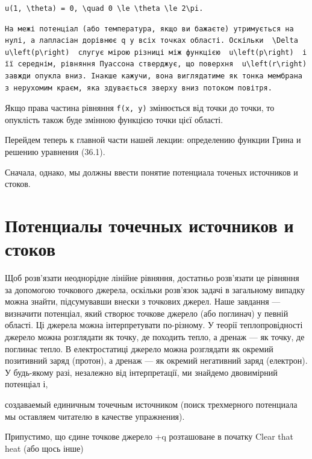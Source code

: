\documentclass[
  ukrainian,
]{article}
\begin{document}
\begin{verbatim}
u(1, \theta) = 0, \quad 0 \le \theta \le 2\pi.
\end{verbatim}

\begin{verbatim}
На межі потенціал (або температура, якщо ви бажаєте) утримується на нулі, а лапласіан дорівнює q у всіх точках області. Оскільки  \Delta u\left(p\right)  слугує мірою різниці між функцією  u\left(p\right)  і її середнім, рівняння Пуассона стверджує, що поверхня  u\left(r\right)  завжди опукла вниз. Інакше кажучи, вона виглядатиме як тонка мембрана з нерухомим краєм, яка здувається зверху вниз потоком повітря.
\end{verbatim}

Якщо права частина рівняння \texttt{f(x,\ y)} змінюється від точки до
точки, то опуклість також буде змінною функцією точки цієї області.

Перейдем теперь к главной части нашей лекции: определению функции Грина
и решению уравнения (36.1).

Сначала, однако, мы должны ввести понятие потенциала точеных источников
и стоков.

\section{Потенциалы точечных источников и
стоков}\label{ux43fux43eux442ux435ux43dux446ux438ux430ux43bux44b-ux442ux43eux447ux435ux447ux43dux44bux445-ux438ux441ux442ux43eux447ux43dux438ux43aux43eux432-ux438-ux441ux442ux43eux43aux43eux432}

Щоб розв'язати неоднорідне лінійне рівняння, достатньо розв'язати це
рівняння за допомогою точкового джерела, оскільки розв'язок задачі в
загальному випадку можна знайти, підсумувавши внески з точкових джерел.
Наше завдання --- визначити потенціал, який створює точкове джерело (або
поглинач) у певній області. Ці джерела можна інтерпретувати по-різному.
У теорії теплопровідності джерело можна розглядати як точку, де походить
тепло, а дренаж --- як точку, де поглинає тепло. В електростатиці
джерело можна розглядати як окремий позитивний заряд (протон), а дренаж
--- як окремий негативний заряд (електрон). У будь-якому разі, незалежно
від інтерпретації, ми знайдемо двовимірний потенціал і,

создаваемый единичным точечным источником (поиск трехмерного потенциала
мы оставляем читателю в качестве упражнения).

Припустимо, що єдине точкове джерело +q розташоване в початку Clear that
heat (або щось інше)
\end{document}
